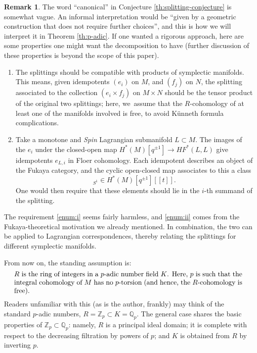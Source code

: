 \documentclass[10pt,a4paper]{amsart}
\newcommand{\llbracket}{[\![}
\newcommand{\rrbracket}{]\!]}
\theoremstyle{plain}
\theoremstyle{definition}
\newtheorem{remark}[theorem]{Remark}
\newcommand{\bQ}{{\mathbb Q}}
\newcommand{\bZ}{{\mathbb Z}}
\begin{document}
\begin{remark}
The word ``canonical'' in Conjecture \ref{th:splitting-conjecture} is somewhat vague. An informal interpretation would be ``given by a geometric construction that does not require further choices'', and this is how we will interpret it in Theorem \ref{th:p-adic}. If one wanted a rigorous approach,
here are some properties one might want the decomposition to have (further discussion of these properties is beyond the scope of this paper).

\begin{enumerate}
\item\label{enum:i}
The splittings should be compatible with products of symplectic manifolds. This means, given idempotents $(e_i)$ on $M$, and $(f_j)$ on $N$, the splitting associated to the collection $(e_i \times f_j)$ on $M \times N$ should be the tensor product of the original two splittings; here, we~assume that the $R$-cohomology of at least one of the manifolds involved is free, to avoid Künneth formula complications.

\item\label{enum:ii}
Take a monotone and {\em Spin} Lagrangian submanifold $L \subset M$. The images of the $e_i$ under the closed-open map $H^*(M)[q^{\pm 1}] \to \mathit{HF}^*(L,L)$ give idempotents $e_{L,i}$ in Floer cohomology. Each idempotent describes an object of the Fukaya category, and the cyclic open-closed map \cite{ganatra23} associates to this a class
\begin{equation*}
[e_{L,i}]_{S^1} \in H^*(M)[q^{\pm 1}]\llbracket t\rrbracket.
\end{equation*}
One would then require that these elements should lie in the $i$-th summand of the splitting.
\end{enumerate}

The requirement \eqref{enum:i} seems fairly harmless, and \eqref{enum:ii} comes from the Fukaya-theore\-ti\-cal motivation we already mentioned. In combination, the two can be applied to Lagrangian correspondences, thereby relating the splittings for different symplectic manifolds.
\end{remark}

\setcounter{theorem}{5}
From now on, the standing assumption is:
\begin{equation} \label{eq:p-adic-number-ring}
\parbox{33em}{$R$ is the ring of integers in a $p$-adic number field $K$. Here, $p$ is such that the integral cohomology of $M$ has no $p$-torsion (and hence, the $R$-cohomology is free).}
\end{equation}
Readers unfamiliar with this (as is the author, frankly) may think of the standard $p$-adic numbers, $R = \bZ_p \subset K = \bQ_p$. The general case shares the basic properties of $\bZ_p \subset \bQ_p$: namely, $R$ is a principal ideal domain; it is complete with respect to the decreasing filtration by powers of $p$; and $K$ is obtained from $R$ by inverting $p$.
\end{document}
